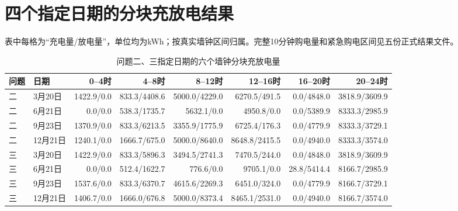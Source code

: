 \section{四个指定日期的分块充放电结果}

\noindent 表中每格为“充电量/放电量”，单位均为kWh；按真实墙钟区间归属。完整10分钟购电量和紧急购电区间见五份正式结果文件。

\begin{table}[H]
\centering
{}
\setlength{\tabcolsep}{2.5pt}
\begin{tabularx}{\textwidth}{@{}llrrrrrr@{}}
\toprule
问题 & 日期 & 0--4时 & 4--8时 & 8--12时 & 12--16时 & 16--20时 & 20--24时\\
\midrule
二 & 3月20日 & 1422.9/0.0 & 833.3/4408.6 & 5000.0/4229.0 & 6270.5/491.5 & 0.0/4848.0 & 3818.9/3609.9\\
二 & 6月21日 & 0.0/0.0 & 538.3/1735.7 & 5632.1/0.0 & 4950.8/0.0 & 0.0/5389.9 & 8333.3/2985.9\\
二 & 9月23日 & 1370.9/0.0 & 833.3/6213.5 & 3355.9/1775.9 & 6725.4/176.3 & 0.0/4779.9 & 8333.3/3729.1\\
二 & 12月21日 & 1240.1/0.0 & 1666.7/675.0 & 5000.0/8640.0 & 8648.8/2415.5 & 0.0/4940.0 & 8333.3/3574.0\\
\midrule
三 & 3月20日 & 1422.9/0.0 & 833.3/5896.3 & 3494.5/2741.3 & 7470.5/244.0 & 0.0/4848.0 & 3818.9/3609.9\\
三 & 6月21日 & 0.0/0.0 & 512.4/1622.7 & 776.6/0.0 & 9705.1/0.0 & 28.8/5414.4 & 8166.7/2985.9\\
三 & 9月23日 & 1537.6/0.0 & 833.3/6370.7 & 4615.6/2269.3 & 6451.0/324.0 & 0.0/4779.9 & 8166.7/3729.1\\
三 & 12月21日 & 1406.7/0.0 & 1666.0/676.8 & 5000.0/8373.4 & 8465.1/2531.0 & 0.0/4940.0 & 8166.7/3574.0\\
\bottomrule
\end{tabularx}
\caption{问题二、三指定日期的六个墙钟分块充放电量}
\label{tab:required_dates_blocks}
\end{table}

